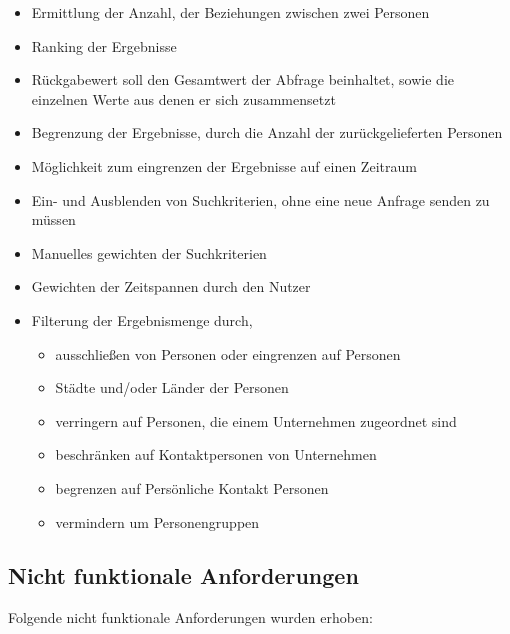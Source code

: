 \begin{itemize}
\item Ermittlung der Anzahl, der Beziehungen zwischen zwei Personen

\item Ranking der Ergebnisse

\item Rückgabewert soll den Gesamtwert der Abfrage beinhaltet, sowie die einzelnen Werte aus denen er sich zusammensetzt

\item Begrenzung der Ergebnisse, durch die Anzahl der zurückgelieferten Personen

\item Möglichkeit zum eingrenzen der Ergebnisse auf einen Zeitraum

\item Ein- und Ausblenden von Suchkriterien, ohne eine neue Anfrage senden zu müssen

\item Manuelles gewichten der Suchkriterien

\item Gewichten der Zeitspannen durch den Nutzer

\item Filterung der Ergebnismenge durch,	
	\begin{itemize}
	\item ausschließen von Personen oder eingrenzen auf Personen
	\item Städte und/oder Länder der Personen
	\item verringern auf Personen, die einem Unternehmen zugeordnet sind 
	\item beschränken auf Kontaktpersonen von Unternehmen
	\item begrenzen auf Persönliche Kontakt Personen
	\item vermindern um Personengruppen
	\end{itemize}
\end{itemize}

\subsection{Nicht funktionale Anforderungen}

Folgende nicht funktionale Anforderungen wurden erhoben:

